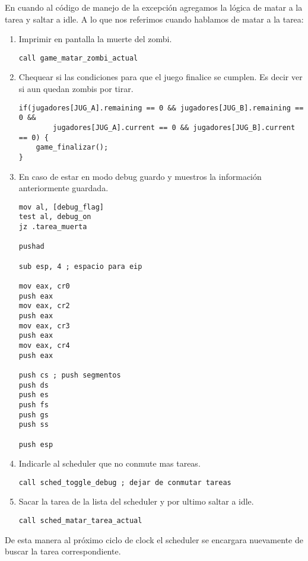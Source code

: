 	En cuando al código de manejo de la excepción agregamos la lógica de matar a la tarea y saltar a idle. A lo que nos referimos cuando hablamos de matar a la tarea:

	\begin{enumerate}
		\item Imprimir en pantalla la muerte del zombi.
	\begin{lstlisting}
call game_matar_zombi_actual	
	\end{lstlisting}

		\item Chequear si las condiciones para que el juego finalice se cumplen. Es decir ver si aun quedan zombis por tirar.
	\begin{lstlisting}
if(jugadores[JUG_A].remaining == 0 && jugadores[JUG_B].remaining == 0 &&
		jugadores[JUG_A].current == 0 && jugadores[JUG_B].current == 0) {
	game_finalizar();
}
	\end{lstlisting}

		\item En caso de estar en modo debug guardo y muestros la información anteriormente guardada.
	\begin{lstlisting}
mov al, [debug_flag]
test al, debug_on
jz .tarea_muerta

pushad

sub esp, 4 ; espacio para eip

mov eax, cr0
push eax
mov eax, cr2
push eax
mov eax, cr3
push eax
mov eax, cr4
push eax

push cs ; push segmentos 
push ds
push es
push fs
push gs
push ss

push esp
	\end{lstlisting}

		\item Indicarle al scheduler que no conmute mas tareas.
	\begin{lstlisting}
call sched_toggle_debug ; dejar de conmutar tareas
	\end{lstlisting}

		\item Sacar la tarea de la lista del scheduler y por ultimo saltar a idle.
	\begin{lstlisting}
call sched_matar_tarea_actual
	\end{lstlisting}
	\end{enumerate} 

	De esta manera al próximo ciclo de clock el scheduler se encargara nuevamente de buscar la tarea correspondiente.